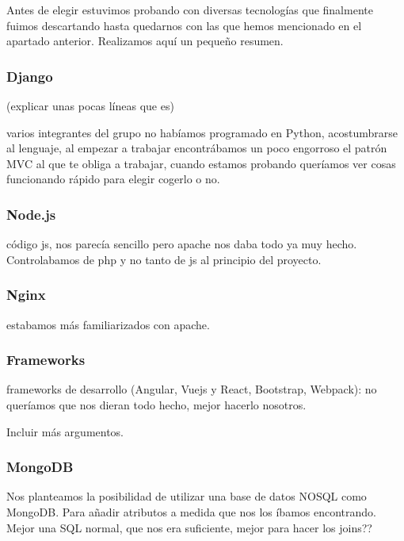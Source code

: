Antes de elegir estuvimos probando con diversas tecnologías que finalmente fuimos descartando hasta quedarnos con las que hemos mencionado en el apartado anterior. Realizamos aquí un pequeño resumen. \par 

\subsubsection{Django}
(explicar unas pocas líneas que es) \par 
varios integrantes del grupo no habíamos programado en Python, acostumbrarse al lenguaje, al empezar a trabajar encontrábamos un poco engorroso el patrón MVC al que te obliga a trabajar, cuando estamos probando queríamos ver cosas funcionando rápido para elegir cogerlo o no. \par 

\subsubsection{Node.js}
código js, nos parecía sencillo pero apache nos daba todo ya muy hecho. Controlabamos de php y no tanto de js al principio del proyecto. \par 

\subsubsection{Nginx}
estabamos más familiarizados con apache. \par 

\subsubsection{Frameworks}
frameworks de desarrollo (Angular, Vuejs y React, Bootstrap, Webpack): no queríamos que nos dieran todo hecho, mejor hacerlo nosotros. \par 
Incluir más argumentos. \par 

\subsubsection{MongoDB}
Nos planteamos la posibilidad de utilizar una base de datos NOSQL como MongoDB. Para añadir atributos a medida que nos los íbamos encontrando. Mejor una SQL normal, que nos era suficiente, mejor para hacer los joins?? \par 

